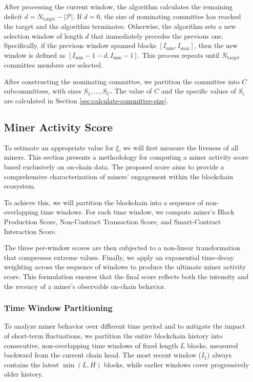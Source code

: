 \documentclass[journal]{IEEEtran}
\begin{document}
After processing the current window, the algorithm calculates the remaining deficit $d = N_{\text{target}} - |\mathcal{P}|$. If $d = 0$, the size of nominating committee has reached the target and the algorithm terminates. Otherwise, the algorithm sets a new selection window of length $d$ that immediately precedes the previous one. Specifically, if the previous window spanned blocks $[I_{\min}, I_{\max}]$, then the new window is defined as $[I_{\min}-1 - d, I_{\min}-1]$. This process repeats until $N_{\text{target}}$ committee members are selected.

After constructing the nominating committee, we partition the committee into $ C $ subcommittees, with sizes $ S_1, \dots, S_C $. The value of $ C $ and the specific values of $ S_i $ are calculated in Section \ref{sec:calculate-committee-size}.

\subsection{Miner Activity Score}
\label{sec:miner-active-score}
To estimate an appropriate value for $\xi$, we will first measure the liveness of all miners. This section presents a methodology for computing a miner activity score based exclusively on on-chain data. The proposed score aims to provide a comprehensive characterization of miners’ engagement within the blockchain ecosystem. 

To achieve this, we will partition the blockchain into a sequence of non-overlapping time windows. For each time window, we compute miner's Block Production Score, Non-Contract Transaction Score, and Smart-Contract Interaction Score.

The three per-window scores are then subjected to a non-linear transformation that compresses extreme values. Finally, we apply an exponential time-decay weighting across the sequence of windows to produce the ultimate miner activity score. This formulation ensures that the final score reflects both the intensity and the recency of a miner’s observable on-chain behavior.

\subsubsection{Time Window Partitioning}
To analyze miner behavior over different time period and to mitigate the impact of short-term fluctuations, we partition the entire blockchain history into consecutive, non-overlapping time windows of fixed length $L$ blocks, measured backward from the current chain head. The most recent window ($I_1$) always contains the latest $\min(L, H)$ blocks, while earlier windows cover progressively older history.
\end{document}
